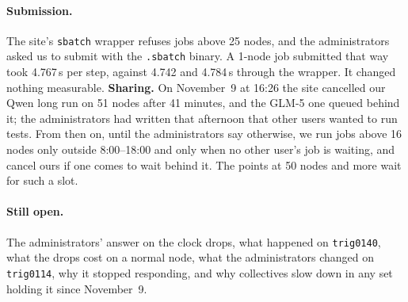 \paragraph{Submission.} The site's \texttt{sbatch} wrapper refuses jobs above 25 nodes, and the administrators asked us to submit with the \texttt{.sbatch} binary. A 1-node job submitted that way took 4.767\,s per step, against 4.742 and 4.784\,s through the wrapper. It changed nothing measurable. \textbf{Sharing.} On November~9 at 16:26 the site cancelled our Qwen long run on 51 nodes after 41 minutes, and the GLM-5 one queued behind it; the administrators had written that afternoon that other users wanted to run tests. From then on, until the administrators say otherwise, we run jobs above 16 nodes only outside 8:00--18:00 and only when no other user's job is waiting, and cancel ours if one comes to wait behind it. The points at 50 nodes and more wait for such a slot.

\paragraph{Still open.} The administrators' answer on the clock drops, what happened on \texttt{trig0140}, what the drops cost on a normal node, what the administrators changed on \texttt{trig0114}, why it stopped responding, and why collectives slow down in any set holding it since November~9.
